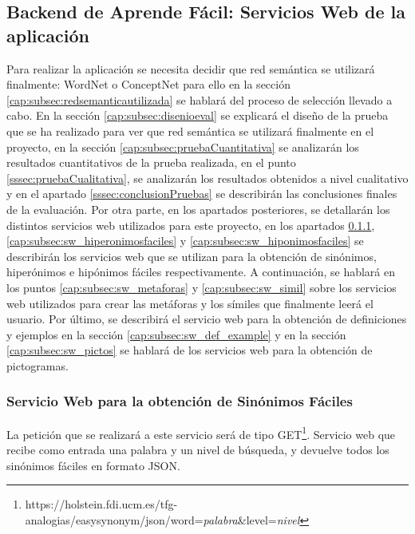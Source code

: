 \subsection{Backend de Aprende Fácil: Servicios Web de la aplicación}
\label{cap:subsec:backendapp}
Para realizar la aplicación se necesita decidir que red semántica se utilizará finalmente: WordNet o ConceptNet para ello en la sección \ref{cap:subsec:redsemanticautilizada} se hablará del proceso de selección llevado a cabo. En la sección \ref{cap:subsec:disenioeval} se explicará el diseño de la prueba que se ha realizado para ver que red semántica se utilizará finalmente en el proyecto, en la sección \ref{cap:subsec:pruebaCuantitativa} se analizarán los resultados cuantitativos de la prueba realizada, en el punto \ref{sssec:pruebaCualitativa}, se analizarán los resultados obtenidos a nivel cualitativo y en el apartado \ref{sssec:conclusionPruebas} se describirán las conclusiones finales de la evaluación. Por otra parte, en los apartados posteriores, se detallarán los distintos servicios web utilizados para este proyecto, en los apartados \ref{cap:subsec:sw_sinonimosfaciles}, \ref{cap:subsec:sw_hiperonimosfaciles} y \ref{cap:subsec:sw_hiponimosfaciles} se describirán los servicios web que se utilizan para la obtención de sinónimos, hiperónimos e hipónimos fáciles respectivamente. A continuación, se hablará en los puntos \ref{cap:subsec:sw_metaforas} y \ref{cap:subsec:sw_simil} sobre los servicios web utilizados para crear las metáforas y los símiles que finalmente leerá el usuario. Por último, se describirá el servicio web para la obtención de definiciones y ejemplos en la sección \ref{cap:subsec:sw_def_example} y en la sección \ref{cap:subsec:sw_pictos} se hablará de los servicios web para la obtención de pictogramas.



 


\subsubsection{Servicio Web para la obtención de Sinónimos Fáciles}
\label{cap:subsec:sw_sinonimosfaciles}

La petición que se realizará a este servicio será de tipo GET\footnote{https://holstein.fdi.ucm.es/tfg-analogias/easysynonym/json/word=\textit{palabra}\&level=\textit{nivel}}.
Servicio web que recibe como entrada una palabra y un nivel de búsqueda, y devuelve todos los sinónimos fáciles en formato JSON. 

